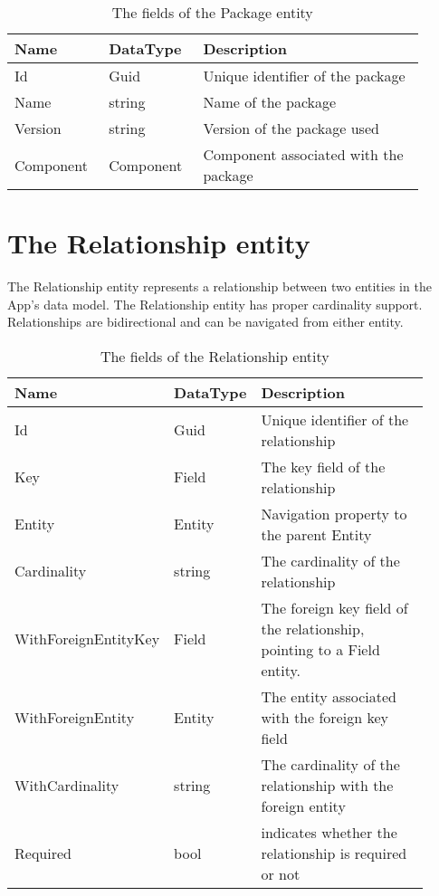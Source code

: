 \begin{table}[H]
\small
\begin{tabular}{ p{0.20\linewidth} p{0.20\linewidth} p{0.50\linewidth} }
\hline
\textbf{Name} & \textbf{DataType} & \textbf{Description} \\
\hline
Id & Guid & Unique identifier of the package \\
Name & string & Name of the package \\
Version & string & Version of the package used \\
Component & Component & Component associated with the package \\
\hline
\end{tabular}
\caption{The fields of the Package entity}
\label{table:package_entity}
\end{table}

\section{The Relationship entity}

The Relationship entity represents a relationship between two entities in the App's data
model. The Relationship entity has proper cardinality support. Relationships are
bidirectional and can be navigated from either entity.

\begin{table}[H]
\small
\begin{tabular}{ p{0.24\linewidth} p{0.12\linewidth} p{0.55\linewidth} }
\hline
\textbf{Name} & \textbf{DataType} & \textbf{Description} \\
\hline
Id & Guid & Unique identifier of the relationship \\
Key & Field & The key field of the relationship \\
Entity & Entity & Navigation property to the parent Entity \\
Cardinality & string & The cardinality of the relationship \\
WithForeignEntityKey & Field & The foreign key field of the relationship, pointing to a
Field entity. \\
WithForeignEntity & Entity & The entity associated with the foreign key field \\
WithCardinality & string & The cardinality of the relationship with the foreign entity \\
Required & bool & indicates whether the relationship is required or not \\
\hline
\end{tabular}
\caption{The fields of the Relationship entity}
\label{table:relationship_entity}
\end{table}